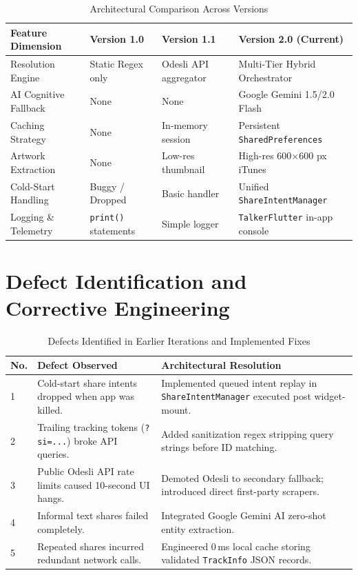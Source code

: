 \documentclass[12pt,a4paper]{report}
\begin{document}
\begin{table}[H]
\centering
\caption{Architectural Comparison Across Versions}
\label{tab:evolution}
\begin{tabularx}{\textwidth}{lXXX}
\toprule
\textbf{Feature Dimension} & \textbf{Version 1.0} & \textbf{Version 1.1} & \textbf{Version 2.0 (Current)} \\
\midrule
Resolution Engine & Static Regex only & Odesli API aggregator & Multi-Tier Hybrid Orchestrator \\
AI Cognitive Fallback & None & None & Google Gemini 1.5/2.0 Flash \\
Caching Strategy & None & In-memory session & Persistent \texttt{SharedPreferences} \\
Artwork Extraction & None & Low-res thumbnail & High-res 600$\times$600 px iTunes \\
Cold-Start Handling & Buggy / Dropped & Basic handler & Unified \texttt{ShareIntentManager} \\
Logging \& Telemetry & \texttt{print()} statements & Simple logger & \texttt{TalkerFlutter} in-app console \\
\bottomrule
\end{tabularx}
\end{table}

\section{Defect Identification and Corrective Engineering}
\begin{table}[H]
\centering
\caption{Defects Identified in Earlier Iterations and Implemented Fixes}
\label{tab:defects}
\begin{tabularx}{\textwidth}{lp{4.2cm}X}
\toprule
\textbf{No.} & \textbf{Defect Observed} & \textbf{Architectural Resolution} \\
\midrule
1 & Cold-start share intents dropped when app was killed. & Implemented queued intent replay in \texttt{ShareIntentManager} executed post widget-mount. \\
2 & Trailing tracking tokens (\texttt{?si=...}) broke API queries. & Added sanitization regex stripping query strings before ID matching. \\
3 & Public Odesli API rate limits caused 10-second UI hangs. & Demoted Odesli to secondary fallback; introduced direct first-party scrapers. \\
4 & Informal text shares failed completely. & Integrated Google Gemini AI zero-shot entity extraction. \\
5 & Repeated shares incurred redundant network calls. & Engineered 0\,ms local cache storing validated \texttt{TrackInfo} JSON records. \\
\bottomrule
\end{tabularx}
\end{table}
\end{document}
